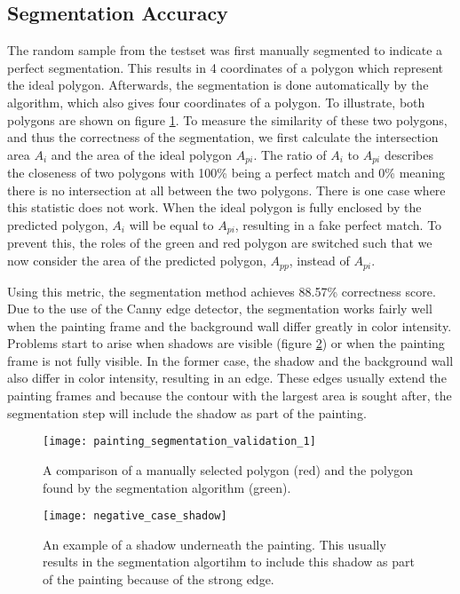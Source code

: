 \subsection{Segmentation Accuracy}
The random sample from the testset was first manually segmented to indicate a perfect segmentation. This results in 4 coordinates of a polygon which represent the ideal polygon. Afterwards, the segmentation is done automatically by the algorithm, which also gives four coordinates of a polygon. To illustrate, both polygons are shown on figure \ref{fig:painting_segmentation_validation_1}.
To measure the similarity of these two polygons, and thus the correctness of the segmentation, we first calculate the intersection area $A_i$ and the area of the ideal polygon $A_{pi}$. The ratio of $A_i$ to $A_{pi}$ describes the closeness of two polygons with 100\% being a perfect match and 0\% meaning there is no intersection at all between the two polygons. There is one case where this statistic does not work. When the ideal polygon is fully enclosed by the predicted polygon, $A_i$ will be equal to $A_{pi}$, resulting in a fake perfect match. To prevent this, the roles of the green and red polygon are switched such that we now consider the area of the predicted polygon, $A_{pp}$, instead of $A_{pi}$.

Using this metric, the segmentation method achieves 88.57\% correctness score. Due to the use of the Canny edge detector, the segmentation works fairly well when the painting frame and the background wall differ greatly in color intensity. Problems start to arise when shadows are visible (figure \ref{fig:negative_case_shadow}) or when the painting frame is not fully visible. In the former case, the shadow and the background wall also differ in color intensity, resulting in an edge. These edges usually extend the painting frames and because the contour with the largest area is sought after, the segmentation step will include the shadow as part of the painting.


\begin{figure}
	\centering
	\texttt{[image: painting\_segmentation\_validation\_1]}
	\caption{A comparison of a manually selected polygon (red) and the polygon found by the segmentation algorithm (green).}
	\label{fig:painting_segmentation_validation_1}
\end{figure}
	\begin{figure}
	\texttt{[image: negative\_case\_shadow]}
	\caption{An example of a shadow underneath the painting. This usually results in the segmentation algortihm to include this shadow as part of the painting because of the strong edge.}
	\label{fig:negative_case_shadow}
\end{figure}


